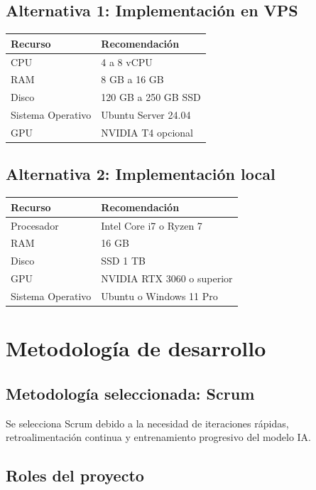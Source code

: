 \documentclass[12pt]{article}
\begin{document}
\subsection{Alternativa 1: Implementación en VPS}

\begin{longtable}{|p{5cm}|p{8cm}|}
\hline
\textbf{Recurso} & \textbf{Recomendación} \\
\hline
CPU & 4 a 8 vCPU \\
\hline
RAM & 8 GB a 16 GB \\
\hline
Disco & 120 GB a 250 GB SSD \\
\hline
Sistema Operativo & Ubuntu Server 24.04 \\
\hline
GPU & NVIDIA T4 opcional \\
\hline
\end{longtable}

\subsection{Alternativa 2: Implementación local}

\begin{longtable}{|p{5cm}|p{8cm}|}
\hline
\textbf{Recurso} & \textbf{Recomendación} \\
\hline
Procesador & Intel Core i7 o Ryzen 7 \\
\hline
RAM & 16 GB \\
\hline
Disco & SSD 1 TB \\
\hline
GPU & NVIDIA RTX 3060 o superior \\
\hline
Sistema Operativo & Ubuntu o Windows 11 Pro \\
\hline
\end{longtable}

\section{Metodología de desarrollo}

\subsection{Metodología seleccionada: Scrum}

Se selecciona Scrum debido a la necesidad de iteraciones rápidas, retroalimentación continua y entrenamiento progresivo del modelo IA.

\subsection{Roles del proyecto}
\end{document}
